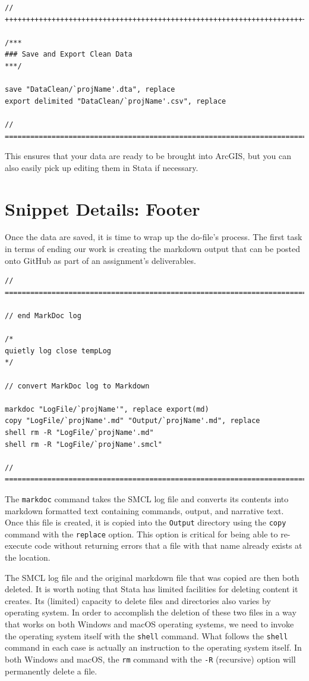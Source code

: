 \documentclass[]{book}
\begin{document}
\begin{verbatim}
// ++++++++++++++++++++++++++++++++++++++++++++++++++++++++++++++++++++++++++

/***
### Save and Export Clean Data
***/

save "DataClean/`projName'.dta", replace
export delimited "DataClean/`projName'.csv", replace

// ==========================================================================
\end{verbatim}

This ensures that your data are ready to be brought into ArcGIS, but you
can also easily pick up editing them in Stata if necessary.

\section{Snippet Details: Footer}\label{snippet-details-footer}

Once the data are saved, it is time to wrap up the do-file's process.
The first task in terms of ending our work is creating the markdown
output that can be posted onto GitHub as part of an assignment's
deliverables.

\begin{verbatim}
// ==========================================================================

// end MarkDoc log

/*
quietly log close tempLog
*/

// convert MarkDoc log to Markdown

markdoc "LogFile/`projName'", replace export(md)
copy "LogFile/`projName'.md" "Output/`projName'.md", replace
shell rm -R "LogFile/`projName'.md"
shell rm -R "LogFile/`projName'.smcl"

// ==========================================================================
\end{verbatim}

The \texttt{markdoc} command takes the SMCL log file and converts its
contents into markdown formatted text containing commands, output, and
narrative text. Once this file is created, it is copied into the
\texttt{Output} directory using the \texttt{copy} command with the
\texttt{replace} option. This option is critical for being able to
re-execute code without returning errors that a file with that name
already exists at the location.

The SMCL log file and the original markdown file that was copied are
then both deleted. It is worth noting that Stata has limited facilities
for deleting content it creates. Its (limited) capacity to delete files
and directories also varies by operating system. In order to accomplish
the deletion of these two files in a way that works on both Windows and
macOS operating systems, we need to invoke the operating system itself
with the \texttt{shell} command. What follows the \texttt{shell} command
in each case is actually an instruction to the operating system itself.
In both Windows and macOS, the \texttt{rm} command with the \texttt{-R}
(recursive) option will permanently delete a file.
\end{document}
